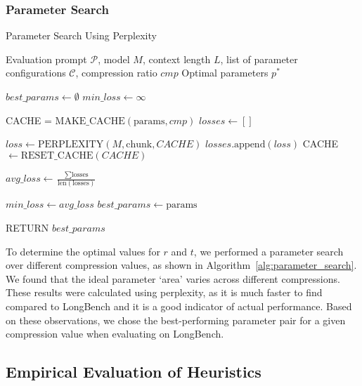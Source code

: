 \subsubsection{Parameter Search}
\label{sec:parameter_search}


\begin{algorithm}
\caption{Parameter Search Using Perplexity}
\begin{algorithmic}[1]
\REQUIRE Evaluation prompt $\mathcal{P}$, model $M$, context length $L$, list of parameter configurations $\mathcal{C}$, compression ratio $cmp$
\ENSURE Optimal parameters $p^*$

\STATE $best\_params \gets \emptyset$
\STATE $min\_loss \gets \infty$

    
    \STATE CACHE = $\text{MAKE\_CACHE}(\text{params}, cmp)$
    \STATE $losses \gets []$
    
     
        \STATE $loss \gets \text{PERPLEXITY}(M, \text{chunk}, CACHE)$
        \STATE $losses.\text{append}(loss)$
        \STATE CACHE $\gets \text{RESET\_CACHE}(CACHE)$
    \ENDFOR

    \STATE $avg\_loss \gets \frac{\sum \text{losses}}{\text{len}(\text{losses})}$

        \STATE $min\_loss \gets avg\_loss$
        \STATE $best\_params \gets \text{params}$
    \ENDIF

\ENDFOR

\STATE RETURN $best\_params$

\end{algorithmic}
\label{alg:parameter_search}

\end{algorithm}

To determine the optimal values for $r$ and $t$, we performed a parameter search over different compression values, as shown in Algorithm~\ref{alg:parameter_search}. We found that the ideal parameter `area' varies across different compressions. These results were calculated using perplexity, as it is much faster to find compared to LongBench and it is a good indicator of actual performance. Based on these observations, we chose the best-performing parameter pair for a given compression value when evaluating on LongBench. 

\subsection{Empirical Evaluation of Heuristics}
\label{sec:empirical}


